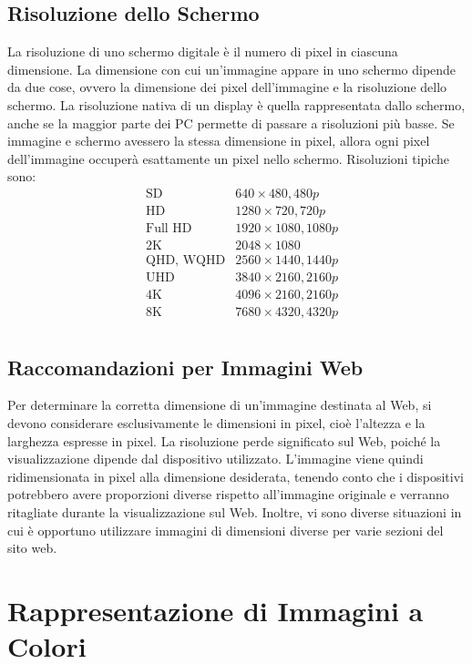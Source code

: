 \documentclass[a4paper,11pt]{article} %
\begin{document}
\subsection{Risoluzione dello Schermo}
La risoluzione di uno schermo digitale è il numero di pixel in ciascuna dimensione. La dimensione con cui un'immagine appare in uno schermo dipende da due cose, ovvero la dimensione dei pixel dell'immagine e la risoluzione dello schermo. La risoluzione nativa di un display è quella rappresentata dallo schermo, anche se la maggior parte dei PC permette di passare a risoluzioni più basse. Se immagine e schermo avessero la stessa dimensione in pixel, allora ogni pixel dell'immagine occuperà esattamente un pixel nello schermo. Risoluzioni tipiche sono: 
\begin{align*}
    &\text{SD} & 640 \times 480, 480p \\
    &\text{HD} & 1280 \times 720, 720p \\
    &\text{Full HD} & 1920 \times 1080, 1080p \\
    &\text{2K} & 2048 \times 1080 \\
    &\text{QHD, WQHD} & 2560 \times 1440, 1440p \\
    &\text{UHD} & 3840 \times 2160, 2160p \\
    &\text{4K} & 4096 \times 2160, 2160p \\
    &\text{8K} & 7680 \times 4320, 4320p \\
\end{align*}

\subsection{Raccomandazioni per Immagini Web}
Per determinare la corretta dimensione di un'immagine destinata al Web, si devono considerare esclusivamente le dimensioni in pixel, cioè l'altezza e la larghezza espresse in pixel. La risoluzione perde significato sul Web, poiché la visualizzazione dipende dal dispositivo utilizzato. L'immagine viene quindi ridimensionata in pixel alla dimensione desiderata, tenendo conto che i dispositivi potrebbero avere proporzioni diverse rispetto all'immagine originale e verranno ritagliate durante la visualizzazione sul Web. Inoltre, vi sono diverse situazioni in cui è opportuno utilizzare immagini di dimensioni diverse per varie sezioni del sito web.

\newpage
\section{Rappresentazione di Immagini a Colori}
\end{document}
